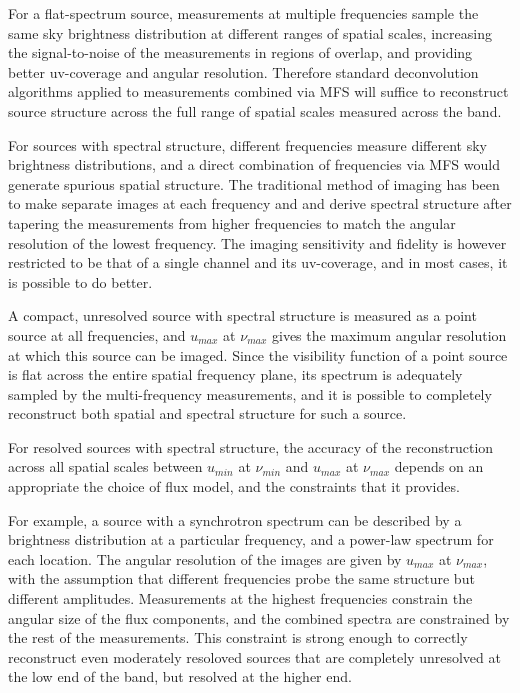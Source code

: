 \documentclass[structabstract]{aa}
\begin{document}

For a flat-spectrum source, measurements at multiple frequencies sample the same sky brightness
distribution at different ranges of spatial scales, increasing the signal-to-noise of the
measurements in regions of overlap, and providing better uv-coverage and angular resolution.
Therefore standard deconvolution algorithms applied to measurements combined via MFS will suffice
to reconstruct source structure across the full range of spatial scales measured across the band.

For sources with spectral structure, different frequencies measure different sky brightness 
distributions, and a direct combination of frequencies via MFS would generate spurious spatial
structure. The traditional method of imaging has been to make separate images at each frequency and
and derive spectral structure after tapering the measurements from higher frequencies to match
the angular resolution of the lowest frequency. 
The imaging sensitivity and fidelity is however restricted to be that of a single channel and its 
uv-coverage, and in most cases, it is possible to do better.

A compact, unresolved source with spectral structure is measured as a point
source at all frequencies, and $u_{max}$ at $\nu_{max}$ gives the maximum angular resolution at
which this source can be imaged. Since the visibility function of a point source is flat across
the entire spatial frequency plane, its spectrum is adequately sampled by the multi-frequency measurements,
and it is possible to completely reconstruct both spatial and spectral structure for such a source.

For resolved sources with spectral structure, the accuracy of the reconstruction
across all spatial scales between $u_{min}$ at $\nu_{min}$ and  $u_{max}$ at $\nu_{max}$
depends on an appropriate the choice of flux model, and the constraints that it provides.

For example, a source with a synchrotron spectrum can be described by a brightness 
distribution at a particular frequency, and a power-law spectrum for each location. 
The angular resolution of the images are given by $u_{max}$ at $\nu_{max}$, with the 
assumption that different frequencies probe the same structure but different amplitudes. 
Measurements at the highest frequencies constrain the angular size of the flux 
components, and the combined spectra are constrained by the rest of the measurements.
This constraint is strong enough to correctly reconstruct even moderately resoloved sources
that are completely unresolved at the low end of the band, but resolved at the higher end.
\end{document}
